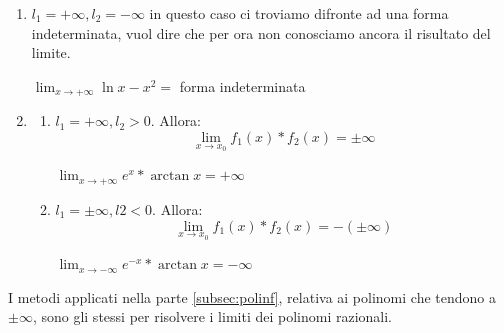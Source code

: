 \begin{enumerate}[label=\textbf{\arabic*})]
    \item $l_1=+\infty, l_2=-\infty$ in questo caso ci troviamo difronte ad una forma indeterminata, vuol dire che per ora non conosciamo ancora il risultato del limite.
    \begin{example}
        $\lim_{x\to+\infty}\ln x-x^2=$ forma indeterminata
    \end{example}
    
    \item
    \begin{enumerate}[label=\textbf{\arabic*})]
        \item $l_1=+\infty, l_2>0$. Allora:
    \begin{equation}
        \lim_{x\to x_0}f_1(x)*f_2(x)=\pm\infty
    \end{equation}
    \begin{example}
        $\lim_{x\to+\infty}e^x*\arctan x=+\infty$
    \end{example}
    
    \item $l_1=\pm\infty, l2<0$. Allora:
    \begin{equation}
        \lim_{x\to x_0}f_1(x)*f_2(x)=-(\pm\infty)
    \end{equation}
    \begin{example}
        $\lim_{x\to-\infty}e^{-x}*\arctan x=-\infty$
    \end{example}
    \end{enumerate}
    
\end{enumerate}

    
    I metodi applicati nella parte \ref{subsec:polinf}, relativa ai polinomi che tendono a $\pm\infty$, sono gli stessi per risolvere i limiti dei polinomi razionali.
    
